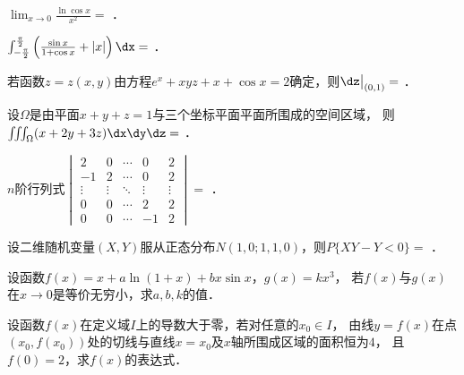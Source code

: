 \documentclass[plain,noanswer,medmath]{../../template/jnuexam}
\begin{document}


\begin{problem}
$\lim_{x \to 0} \frac{\ln \cos x}{x^2} =$ \fillin{}．
\end{problem}


\begin{problem}
$\int_{-\frac{\pi}{2}}^{\frac{\pi}{2}} \left(\frac{\sin x}{1+\cos x} + |x|\right)\dx =$ \fillin{}．
\end{problem}


\begin{problem}
若函数$z = z(x,y)$由方程$e^x + xyz + x + \cos x = 2$确定，则$\dz\big|_{(0,1)} =$ \fillin{}．
\end{problem}


\begin{problem}
设$\Omega$是由平面$x + y + z = 1$与三个坐标平面平面所围成的空间区域，\goodbreak
则$\iiint_{\Omega}(x + 2y + 3z)\dx\dy\dz =$ \fillin{}．
\end{problem}


\begin{problem}
$n$阶行列式$\begin{vmatrix}
       2 &      0 & \cdots &      0 & 2 \\
      -1 &      2 & \cdots &      0 & 2 \\
  \vdots & \vdots & \ddots & \vdots & \vdots \\
       0 &      0 & \cdots &      2 & 2 \\
       0 &      0 & \cdots &     -1 & 2
\end{vmatrix} =$ \fillin{}．
\end{problem}


\begin{problem}
设二维随机变量$(X,Y)$服从正态分布$N(1,0;1,1,0)$，则$P\{XY - Y < 0\} =$ \fillin{}．
\end{problem}




\begin{problem}[points=10]
设函数$f(x) = x + a\ln(1 + x) + bx\sin x$，$g(x) = kx^3$，
若$f(x)$与$g(x)$在$x \to 0$是等价无穷小，求$a,b,k$的值．
\end{problem}


\begin{problem}[points=10]
设函数$f(x)$在定义域$I$上的导数大于零，若对任意的$x_0 \in I$，
由线$y = f(x)$在点$\left(x_0,f(x_0)\right)$处的切线与直线$x = x_0$及$x$轴所围成区域的面积恒为$4$，
且$f(0) = 2$，求$f(x)$的表达式．
\end{problem}
\end{document}

